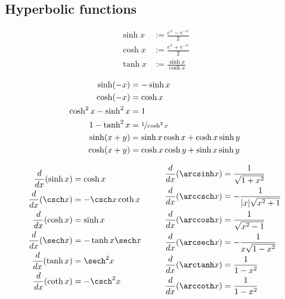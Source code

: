 \documentclass{article}
\begin{document}
\subsection{Hyperbolic functions}
\begin{definition}
    \begin{align*}
        \sinh x &:= \frac{e^x-e^{-x}}{2}\\
        \cosh x &:= \frac{e^x+e^{-x}}{2}\\
        \tanh x &:= \frac{\sinh x}{\cosh x}
    \end{align*}
\end{definition}
\begin{theorem}
    \begin{align*}
        \sinh(-x) &= -\sinh x\\
        \cosh(-x) &= \cosh x\\
        \cosh^2x - \sinh^2x &= 1\\
        1-\tanh^2 x &= \nicefrac{1}{\cosh^2x}\\
        \sinh(x+y) &=\sinh x \cosh x + \cosh x \sinh y\\
        \cosh(x+y) &= \cosh x \cosh y + \sinh x \sinh y 
    \end{align*}
\end{theorem}
\begin{theorem}
    \begin{align*}
        \begin{aligned}
            \frac{d}{dx}(\sinh x)&=\cosh x\\
            \frac{d}{dx}(\csch x)&=-\csch x \coth x\\
            \frac{d}{dx}(\cosh x)&=\sinh x\\
            \frac{d}{dx}(\sech x)&= -\tanh x \sech x\\
            \frac{d}{dx}(\tanh x)&=\sech^2 x\\
            \frac{d}{dx}(\coth x)&= -\csch^2 x
        \end{aligned}
        \hspace{1cm}
        \begin{aligned}
            \frac{d}{dx}(\arcsinh x)&=\frac{1}{\sqrt{1+x^2}}\\
            \frac{d}{dx}(\arccsch x)&=-\frac{1}{|x|\sqrt{x^2+1}}\\
            \frac{d}{dx}(\arccosh x)&=\frac{1}{\sqrt{x^2-1}}\\
            \frac{d}{dx}(\arcsech x)&= -\frac{1}{x\sqrt{1-x^2}}\\
            \frac{d}{dx}(\arctanh x)&=\frac{1}{1-x^2}\\
            \frac{d}{dx}(\arccoth x)&= \frac{1}{1-x^2}
        \end{aligned}
    \end{align*}
\end{theorem}
\end{document}
